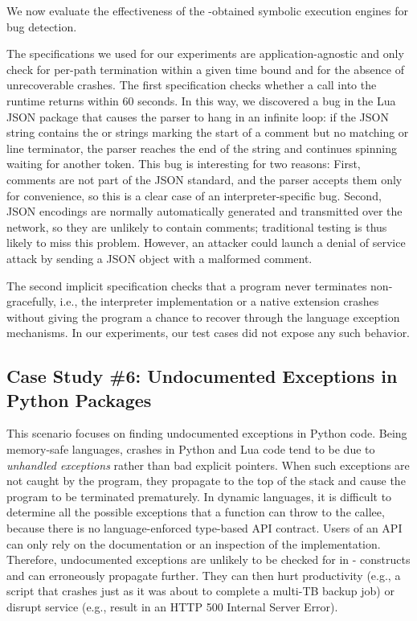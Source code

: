 We now evaluate the effectiveness of the \chef-obtained symbolic execution engines for bug detection.

The specifications we used for our experiments are application-agnostic and only check for per-path termination within a given time bound and for the absence of unrecoverable crashes.  The first specification checks whether a call into the runtime returns within 60 seconds.  In this way, we discovered a bug in the Lua JSON package that causes the parser to hang in an infinite loop: if the JSON string contains the \codebit{/*} or \codebit{//} strings marking the start of a comment but no matching \codebit{*/} or line terminator, the parser reaches the end of the string and continues spinning waiting for another token.
%
This bug is interesting for two reasons: First, comments are not part of the JSON standard, and the parser accepts them only for convenience, so this is a clear case of an interpreter-specific bug.  Second, JSON encodings are normally automatically generated and transmitted over the network, so they are unlikely to contain comments; traditional testing is thus likely to miss this problem. However, an attacker could launch a denial of service attack by sending a JSON object with a malformed comment.

The second implicit specification checks that a program never terminates non-gracefully, i.e., the interpreter implementation or a native extension crashes without giving the program a chance to recover through the language exception mechanisms.  In our experiments, our test cases did not expose any such behavior.


\subsection{Case Study \#6: Undocumented Exceptions in Python Packages}
\label{sec:eval:undoc-except}

This scenario focuses on finding undocumented exceptions in Python code.
%
Being memory-safe languages, crashes in Python and Lua code tend to be due to \emph{unhandled exceptions} rather than bad explicit pointers.  When such exceptions are not caught by the program, they propagate to the top of the stack and cause the program to be terminated prematurely. 
%
In dynamic languages, it is difficult to determine all the possible exceptions that a function can throw to the callee, because there is no language-enforced type-based API contract.  Users of an API can only rely on the documentation or an inspection of the implementation.  Therefore, undocumented exceptions are unlikely to be checked for in - constructs and can erroneously propagate further.
%
They can then hurt productivity (e.g., a script that crashes just as it was about to complete a multi-TB backup job) or disrupt service (e.g., result in an HTTP 500 Internal Server Error).

